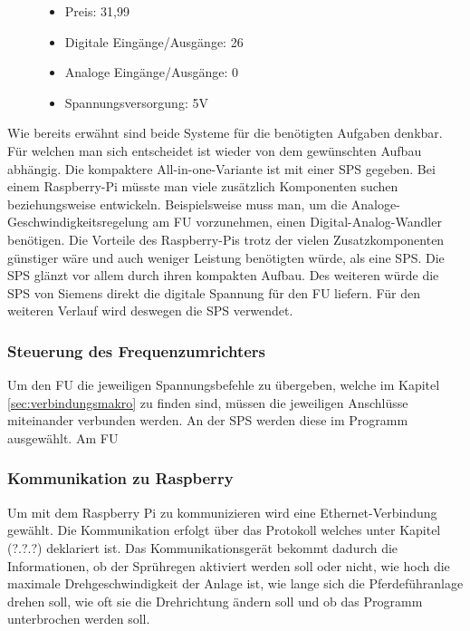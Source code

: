 \begin{figure}[H]
\begin{minipage}[t]{0.45\textwidth}
\begin{itemize}
	\item{Preis: 31,99\textsf{\texteuro}}
	\item{Digitale Eingänge/Ausgänge: 26}
	\item{Analoge Eingänge/Ausgänge: 0}
	\item{Spannungsversorgung: 5V}
\end{itemize}
\end{minipage}
\end{figure}

Wie bereits erwähnt sind beide Systeme für die benötigten Aufgaben denkbar. Für welchen man sich entscheidet ist wieder von dem gewünschten Aufbau abhängig. Die kompaktere All-in-one-Variante ist mit einer SPS gegeben. Bei einem Raspberry-Pi müsste man viele zusätzlich Komponenten suchen beziehungsweise entwickeln. Beispielsweise muss man, um die Analoge-Geschwindigkeitsregelung am \ac{FU} vorzunehmen, einen Digital-Analog-Wandler benötigen. Die Vorteile des Raspberry-Pis trotz der vielen Zusatzkomponenten günstiger wäre und auch weniger Leistung benötigten würde, als eine SPS. Die SPS glänzt vor allem durch ihren kompakten Aufbau. Des weiteren würde die SPS von Siemens direkt die digitale Spannung für den \ac{FU} liefern. Für den weiteren Verlauf wird deswegen die SPS verwendet. 

\subsubsection{Steuerung des Frequenzumrichters}
\label{sec:steuerungFU}

Um den \acl{FU} die jeweiligen Spannungsbefehle zu übergeben, welche im Kapitel \ref{sec:verbindungsmakro} zu finden sind, müssen die jeweiligen Anschlüsse miteinander verbunden werden. An der SPS werden diese im Programm ausgewählt. Am \ac{FU} 

\subsubsection{Kommunikation zu Raspberry}
\label{sec:kommunikationZuRaspberry}


Um mit dem Raspberry Pi zu kommunizieren wird eine Ethernet-Verbindung gewählt. Die Kommunikation erfolgt über das Protokoll welches unter Kapitel (?.?.?) deklariert ist. Das Kommunikationsgerät bekommt dadurch die Informationen, ob der Sprühregen aktiviert werden soll oder nicht, wie hoch die maximale Drehgeschwindigkeit der Anlage ist, wie lange sich die Pferdeführanlage drehen soll, wie oft sie die Drehrichtung ändern soll und ob das Programm unterbrochen werden soll.


